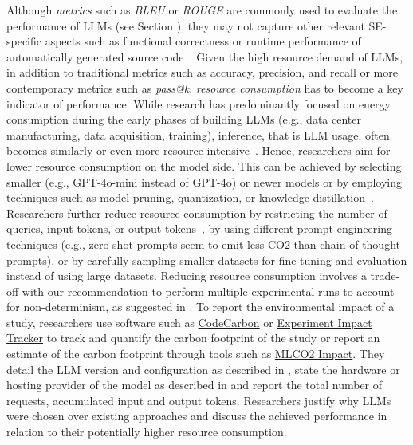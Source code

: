 Although \emph{metrics} such as \emph{BLEU} or \emph{ROUGE} are commonly used to evaluate the performance of LLMs (see Section \benchmarksmetrics), they may not capture other relevant SE-specific aspects such as functional correctness or runtime performance of automatically generated source code~\cite{DBLP:conf/nips/LiuXW023}.
Given the high resource demand of LLMs, in addition to traditional metrics such as accuracy, precision, and recall or more contemporary metrics such as \emph{pass@k}, \emph{resource consumption} has to become a key indicator of performance. %
While research has predominantly focused on energy consumption during the early phases of building LLMs (e.g., data center manufacturing, data acquisition, training), inference, that is LLM usage, often becomes similarly or even more resource-intensive~\cite{de2023growing, DBLP:conf/mlsys/WuRGAAMCBHBGGOM22, DBLP:journals/corr/abs-2410-02950, JIANG2024202, mitu2024hidden}.
Hence, researchers \should aim for lower resource consumption on the model side.
This can be achieved by selecting smaller (e.g., GPT-4o-mini instead of GPT-4o) or newer models or by employing techniques such as model pruning, quantization, or knowledge distillation~\cite{mitu2024hidden}.
Researchers \may further reduce resource consumption by restricting the number of queries, input tokens, or output tokens~\cite{mitu2024hidden}, by using different prompt engineering techniques (e.g., zero-shot prompts seem to emit less CO2 than chain-of-thought prompts), or by carefully sampling smaller datasets for fine-tuning and evaluation instead of using large datasets.
Reducing resource consumption involves a trade-off with our recommendation to perform multiple experimental runs to account for non-determinism, as suggested in \benchmarksmetrics.
To report the environmental impact of a study, researchers \should use software such as \href{https://github.com/mlco2/codecarbon}{CodeCarbon} or \href{experiment-impact-tracker}{Experiment Impact Tracker} to track and quantify the carbon footprint of the study or report an estimate of the carbon footprint through tools such as \href{https://mlco2.github.io/impact/#about}{MLCO2 Impact}.
They \should detail the LLM version and configuration as described in \modelversion, state the hardware or hosting provider of the model as described in \toolarchitecture and report the total number of requests, accumulated input and output tokens.
Researchers \must justify why LLMs were chosen over existing approaches and discuss the achieved performance in relation to their potentially higher resource consumption.

